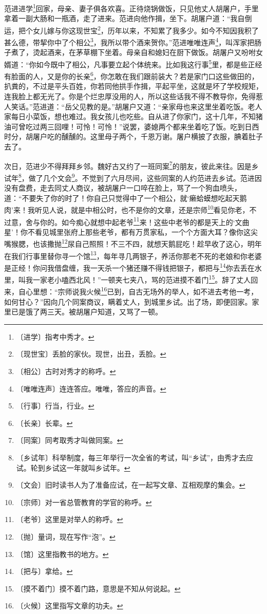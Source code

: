\documentclass[12pt,UTF-8,openany]{ctexbook}
\begin{document}
\begin{large}
    
    范进进学\footnote{〔进学〕指考中秀才。}回家，母亲、妻子俱各欢喜。正待烧锅做饭，只见他丈人胡屠户，手里拿着一副大肠和一瓶酒，走了进来。范进向他作揖，坐下。胡屠户道：“我自倒运，把个女儿嫁与你这现世宝\footnote{〔现世宝〕丢脸的家伙。现世，出丑，丢脸。}，历年以来，不知累了我多少。如今不知因我积了甚么德，带挈你中了个相公\footnote{〔相公〕古时对秀才的称呼。}，我所以带个酒来贺你。”范进唯唯连声\footnote{〔唯唯连声〕连连答应。唯唯，答应的声音。}，叫浑家把肠子煮了，烫起酒来，在茅草棚下坐着。母亲自和媳妇在厨下做饭。胡屠户又吩咐女婿道：“你如今既中了相公，凡事要立起个体统来。比如我这行事\footnote{〔行事〕行当，行业。}里，都是些正经有脸面的人，又是你的长亲\footnote{〔长亲〕长辈。}，你怎敢在我们跟前装大？若是家门口这些做田的，扒粪的，不过是平头百姓，你若同他拱手作揖，平起平坐，这就是坏了学校规矩，连我脸上都无光了。你是个烂忠厚没用的人，所以这些话我不得不教导你，免得惹人笑话。”范进道：“岳父见教的是。”胡屠户又道：“亲家母也来这里坐着吃饭。老人家每日小菜饭，想也难过。我女孩儿也吃些。自从进了你家门，这十几年，不知猪油可曾吃过两三回哩！可怜！可怜！”说罢，婆媳两个都来坐着吃了饭。吃到日西时分，胡屠户吃的醺醺的。这里母子两个，千恩万谢。屠户横披了衣服，腆着肚子去了。
    
    次日，范进少不得拜拜乡邻。魏好古又约了一班同案\footnote{〔同案〕同考取秀才叫做同案。}的朋友，彼此来往。因是乡试年\footnote{〔乡试年〕科举制度，每三年举行一次全省的考试，叫“乡试”，由秀才去应试。轮到乡试这一年就叫乡试年。}，做了几个文会\footnote{〔文会〕旧时读书人为了准备应试，在一起写文章、互相观摩的集会。}。不觉到了六月尽间，这些同案的人约范进去乡试。范进因没有盘费，走去同丈人商议，被胡屠户一口啐在脸上，骂了一个狗血喷头，道：“不要失了你的时了！你自己只觉得中了一个相公，就‘癞蛤蟆想吃起天鹅肉’来！我听见人说，就是中相公时，也不是你的文章，还是宗师\footnote{〔宗师〕对一省总管教育的学官的称呼。}看见你老，不过意，舍与你的。如今痴心就想中起老爷\footnote{〔老爷〕这里是对举人的称呼。}来！这些中老爷的都是天上的‘文曲星’！你不看见城里张府上那些老爷，都有万贯家私，一个个方面大耳？像你这尖嘴猴腮，也该撒抛\footnote{〔抛〕量词，现在写作“泡”。}尿自己照照！不三不四，就想天鹅屁吃！趁早收了这心，明年在我们行事里替你寻一个馆\footnote{〔馆〕这里指教书的地方。}，每年寻几两银子，养活你那老不死的老娘和你老婆是正经！你问我借盘缠，我一天杀一个猪还赚不得钱把银子，都把与\footnote{〔把与〕拿给。}你去丢在水里，叫我一家老小嗑西北风！”一顿夹七夹八，骂的范进摸不着门\footnote{〔摸不着门〕摸不着门路，意思是不知从何说起。}。辞了丈人回来，自心里想：“宗师说我火候\footnote{〔火候〕这里指写文章的功夫。}已到，自古无场外的举人，如不进去考他一考，如何甘心？”因向几个同案商议，瞒着丈人，到城里乡试。出了场，即便回家。家里已是饿了两三天。被胡屠户知道，又骂了一顿。
    

\end{large}
\end{document}
